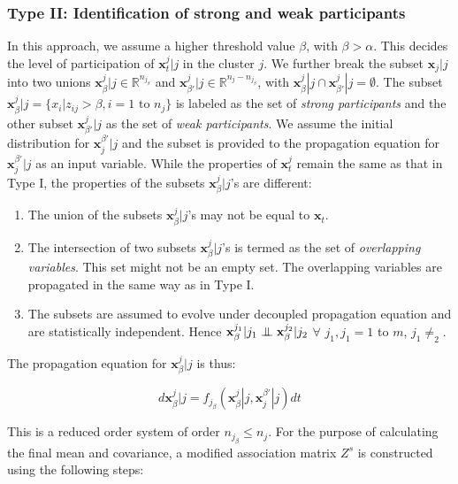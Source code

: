 \subsubsection{Type II: Identification of strong and weak participants}
\label{type_II}

In this approach, we assume a higher threshold value $\beta$, with $\beta > \alpha$. This decides the level of participation of $\textbf{x}_t^{j}|j$ in the cluster $j$. We further break the subset $\textbf{x}_j|j$ into two unions $\textbf{x}_{\beta}^{j}|j \in \mathbb{R}^{n_{j_\beta}}$ and $\textbf{x}_{\beta'}^{j}|j \in \mathbb{R}^{n_j - n_{j_\beta}}$, with $\textbf{x}_{\beta}^{j}|j \cap \textbf{x}_{\beta'}^{j}|j = \emptyset$. The subset $\textbf{x}_{\beta}^{j}|j = \lbrace x_i | z_{ij} > \beta, i = 1 \text{ to } n_j \rbrace$ is labeled as the set of \textit{strong participants} and the other subset $\textbf{x}_{\beta'}^{j}|j$ as the set of \textit{weak participants}. We assume the initial distribution for $\textbf{x}_j^{\beta'}|j$ and the subset is provided to the propagation equation for $\textbf{x}_j^{\beta'}|j$ as an input variable. While the properties of $\textbf{x}^j_t$ remain the same as that in Type I, the properties of the subsets $\textbf{x}_{\beta}^{j}|j$'s are different:
\begin{enumerate}
\item The union of the subsets $\textbf{x}_{\beta}^{j}|j$'s may not be equal to $\textbf{x}_t$.
\item The intersection of two subsets $\textbf{x}_{\beta}^{j}|j$'s is termed as the set of \textit{overlapping variables}. This set might not be an empty set. The overlapping variables are propagated in the same way as in Type I.
\item The subsets are assumed to evolve under decoupled propagation equation and are statistically independent. Hence $\textbf{x}_{\beta}^{j_1}|j_1 \mathrel{\perp\mspace{-10mu}\perp} \textbf{x}_{\beta}^{j_2}|j_2$ $\forall$ $j_1, j_1 = 1$ to $m$, $j_1 \neq _2$. 
\end{enumerate}
 The propagation equation for $\textbf{x}_{\beta}^{j}|j$ is thus:

\begin{equation}
d \textbf{x}_{\beta}^{j}|j = f_{j_\beta} (\textbf{x}_{\beta}^{j}|j, \textbf{x}_j^{\beta'}|j)dt 
\end{equation}

This is a reduced order system of order $n_{j_\beta} \leq n_j$. For the purpose of calculating the final mean and covariance, a modified association matrix $Z^s$ is constructed using the following steps:

